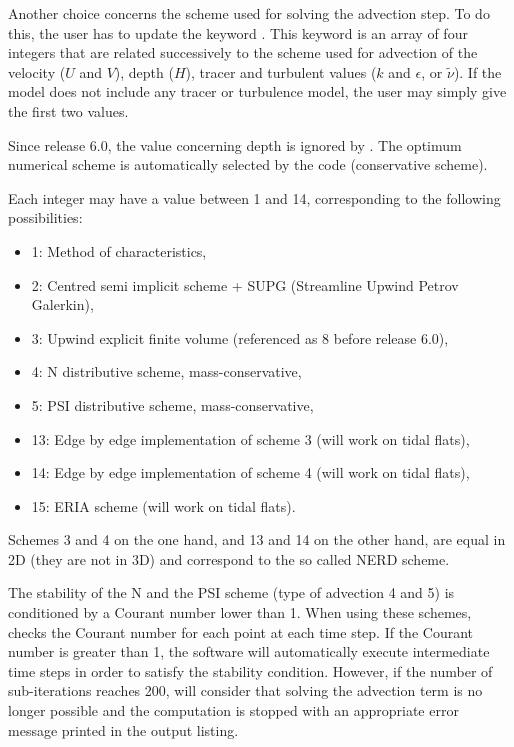 Another choice concerns the scheme used for solving the advection step.
To do this, the user has to update the keyword .
This keyword is an array of four integers that are related successively
to the scheme used for advection of the velocity ($U$ and $V$), depth ($H$),
tracer and turbulent values ($k$ and $\epsilon$, or $\tilde{\nu}$).
If the model does not include any tracer or turbulence model,
the user may simply give the first two values.

Since release 6.0, the value concerning depth is ignored by .
The optimum numerical scheme is automatically selected by the code
(conservative scheme).

Each integer may have a value between 1 and 14, corresponding to the following
possibilities:

\begin{itemize}
\item 1: Method of characteristics,

\item 2: Centred semi implicit scheme + SUPG
(Streamline Upwind Petrov Galerkin),

\item 3: Upwind explicit finite volume
(referenced as 8 before release 6.0),

\item 4: N distributive scheme, mass-conservative,

\item 5: PSI distributive scheme, mass-conservative,
%

\item 13: Edge by edge implementation of scheme 3
(will work on tidal flats),

\item 14: Edge by edge implementation of scheme 4
(will work on tidal flats),

\item 15: ERIA scheme (will work on tidal flats).
\end{itemize}

Schemes 3 and 4 on the one hand, and 13 and 14 on the other hand, are equal
in 2D (they are not in 3D) and correspond to the so called NERD scheme.

The stability of the N and the PSI scheme (type of advection 4 and 5)
is conditioned by a Courant number lower than 1.
When using these schemes,  checks the Courant number
for each point at each time step.
If the Courant number is greater than 1, the software will automatically execute
intermediate time steps in order to satisfy the stability condition.
However, if the number of sub-iterations reaches 200,  will consider
that solving the advection term is no longer possible and the computation is
stopped with an appropriate error message printed in the output listing.

